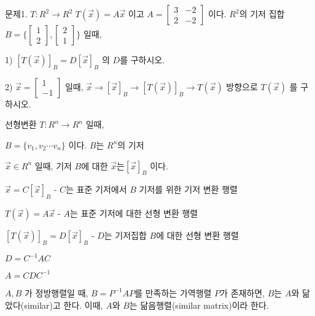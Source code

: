 문제1. $T: R^2 \rightarrow R^2$   $T(\vec{x}) = A\vec{x}$ 이고 $A=\begin{bmatrix} 3 & -2 \\ 2 & -2 \end{bmatrix}$ 이다. $R^2$의 기저 집합 $B = \{ \begin{bmatrix} 1 \\ 2\end{bmatrix}, \begin{bmatrix} 2 \\ 1\end{bmatrix} \}$ 일때, 

1) $[T(\vec{x})]_B = D[\vec{x}]_B$ 의 $D$를 구하시오.

2) $\vec{x}=\begin{bmatrix}1 \\ -1 \end{bmatrix}$ 일때, $\vec{x} \rightarrow [\vec{x}]_B \rightarrow [T(\vec{x})]_B \rightarrow T(\vec{x})$ 방향으로 $T(\vec{x})$ 를 구하시오.


\newpage
\begin{theorem}
선형변환 $T: R^n \rightarrow R^n$ 일때,

$B = \{ v_1, v_2 \cdots v_n  \}$ 이다. $B$는 $R^n$의 기저

$\vec{x} \in R^n$ 일때, 기저 $B$에 대한 $\vec{x} 는 [\vec{x}]_B$ 이다.

$\vec{x} = C[\vec{x}]_B$ - $C$는 표준 기저에서 $B$ 기저를 위한 기저 변환 행렬

$T(\vec{x}) = A\vec{x}$ - $A$는 표준 기저에 대한 선형 변환 행렬

$[T(\vec{x})]_B = D[\vec{x}]_B$ - $D$는 기저집합 $B$에 대한 선형 변환 행렬

$D = C^{-1}AC$

$A = CDC^{-1}$
\end{theorem}

\begin{definition} 

$A,B$ 가 정방행렬일 때, $B=P^{-1}AP$를 만족하는 가역행렬 $P$가 존재하면, $B$는 $A$와 닮았다(similar)고 한다. 이때, $A$와 $B$는 닮음행렬(similar matrix)이라 한다.

\end{definition}

